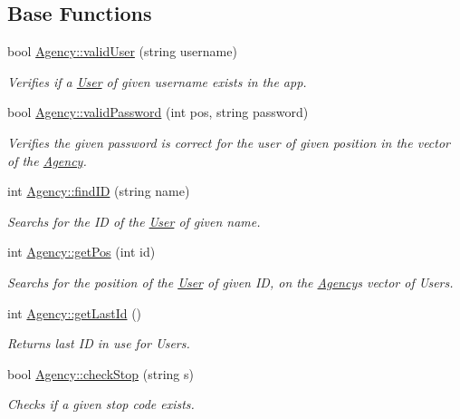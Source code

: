 \subsection*{Base Functions}
\begin{DoxyCompactItemize}
\item 
bool \hyperlink{group___agency_ga633274c6bc861317f03bf378e5286312}{Agency\+::valid\+User} (string username)
\begin{DoxyCompactList}\small\item\em Verifies if a \hyperlink{class_user}{User} of given username exists in the app. \end{DoxyCompactList}\item 
bool \hyperlink{group___agency_ga12c6a13fdeaaa5a2adab736313b3d180}{Agency\+::valid\+Password} (int pos, string password)
\begin{DoxyCompactList}\small\item\em Verifies the given password is correct for the user of given position in the vector of the \hyperlink{class_agency}{Agency}. \end{DoxyCompactList}\item 
int \hyperlink{group___agency_gab129c30ae0ba6c735d0f600c1b00894d}{Agency\+::find\+ID} (string name)
\begin{DoxyCompactList}\small\item\em Searchs for the ID of the \hyperlink{class_user}{User} of given name. \end{DoxyCompactList}\item 
int \hyperlink{group___agency_ga7ec884913bb5c9803cc5b71dc4a569d3}{Agency\+::get\+Pos} (int id)
\begin{DoxyCompactList}\small\item\em Searchs for the position of the \hyperlink{class_user}{User} of given ID, on the \hyperlink{class_agency}{Agency}\textquotesingle{}s vector of Users. \end{DoxyCompactList}\item 
int \hyperlink{group___agency_ga4f91eb604ad3eb3ea8142b8ab65b968d}{Agency\+::get\+Last\+Id} ()
\begin{DoxyCompactList}\small\item\em Returns last ID in use for Users. \end{DoxyCompactList}\item 
bool \hyperlink{group___agency_ga5de11a6e7a081abefea2560290d542b6}{Agency\+::check\+Stop} (string s)
\begin{DoxyCompactList}\small\item\em Checks if a given stop code exists. \end{DoxyCompactList}\item 

\end{DoxyCompactItemize}
